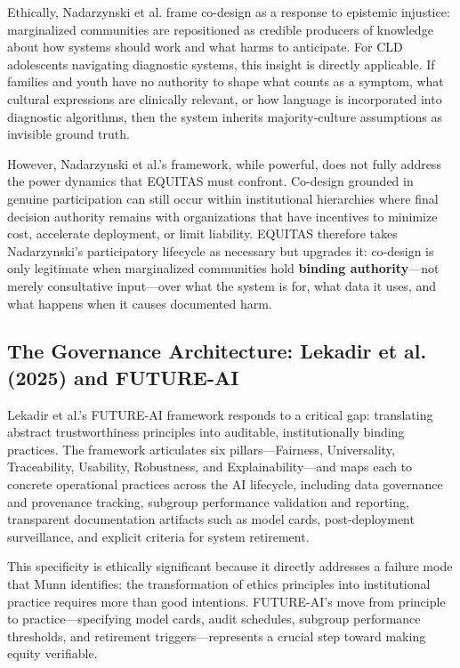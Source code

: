 \documentclass[12pt,a4paper]{article}
\begin{document}
Ethically, Nadarzynski et al. frame co-design as a response to epistemic injustice: marginalized communities are repositioned as credible producers of knowledge about how systems should work and what harms to anticipate. For CLD adolescents navigating diagnostic systems, this insight is directly applicable. If families and youth have no authority to shape what counts as a symptom, what cultural expressions are clinically relevant, or how language is incorporated into diagnostic algorithms, then the system inherits majority-culture assumptions as invisible ground truth.\cite{nadarzynski2024}

However, Nadarzynski et al.'s framework, while powerful, does not fully address the power dynamics that EQUITAS must confront. Co-design grounded in genuine participation can still occur within institutional hierarchies where final decision authority remains with organizations that have incentives to minimize cost, accelerate deployment, or limit liability. EQUITAS therefore takes Nadarzynski's participatory lifecycle as necessary but upgrades it: co-design is only legitimate when marginalized communities hold \textbf{binding authority}—not merely consultative input—over what the system is for, what data it uses, and what happens when it causes documented harm.\cite{nadarzynski2024}

\subsection{The Governance Architecture: Lekadir et al. (2025) and FUTURE-AI}

Lekadir et al.'s FUTURE-AI framework responds to a critical gap: translating abstract trustworthiness principles into auditable, institutionally binding practices. The framework articulates six pillars—Fairness, Universality, Traceability, Usability, Robustness, and Explainability—and maps each to concrete operational practices across the AI lifecycle, including data governance and provenance tracking, subgroup performance validation and reporting, transparent documentation artifacts such as model cards, post-deployment surveillance, and explicit criteria for system retirement.\cite{lekadir2025}

This specificity is ethically significant because it directly addresses a failure mode that Munn identifies: the transformation of ethics principles into institutional practice requires more than good intentions. FUTURE-AI's move from principle to practice—specifying model cards, audit schedules, subgroup performance thresholds, and retirement triggers—represents a crucial step toward making equity verifiable.\cite{lekadir2025}
\end{document}
